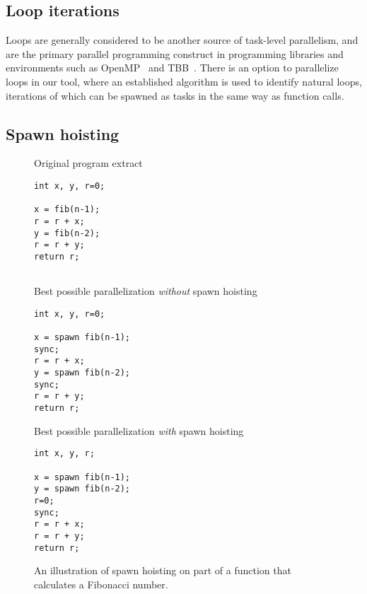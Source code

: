 \subsection{Loop iterations}
Loops are generally considered to be another source of task-level parallelism, and are the primary parallel programming construct in programming libraries and environments such as OpenMP~\cite{dagum98openmp} and TBB~\cite{reinders07intel}.
There is an option to parallelize loops in our tool, where an established algorithm \cite{aho86compilers, muchnick97advanced} is used to identify natural loops, iterations of which can be spawned as tasks in the same way as function calls.

\subsection{Spawn hoisting}

\begin{figure}
  \begin{center}
  \scriptsize
  \begin{SubFloat}{\label{spawn:orig}Original program extract}
    \begin{minipage}{0.7in}
      \begin{verbatim}
int x, y, r=0;

x = fib(n-1);
r = r + x;
y = fib(n-2);
r = r + y;
return r;


      \end{verbatim}
    \end{minipage}%
  \end{SubFloat}%
  \qquad
  \begin{SubFloat}{\label{spawn:without}Best possible parallelization \emph{without} spawn hoisting}
    \begin{minipage}{1.0in}
      \begin{verbatim}
int x, y, r=0;

x = spawn fib(n-1);
sync;
r = r + x;
y = spawn fib(n-2);
sync;
r = r + y;
return r;
      \end{verbatim}
    \end{minipage}%
  \end{SubFloat}%
  \qquad
  \begin{SubFloat}{\label{spawn:with}Best possible parallelization \emph{with} spawn hoisting}
    \begin{minipage}{1.0in}
      \begin{verbatim}
int x, y, r;

x = spawn fib(n-1);
y = spawn fib(n-2);
r=0;
sync;
r = r + x;
r = r + y;
return r;
      \end{verbatim}
    \end{minipage}%
  \end{SubFloat}%
  \end{center}
  \caption{An illustration of spawn hoisting on part of a function that calculates a Fibonacci number.}
  \label{spawn}
\end{figure}


